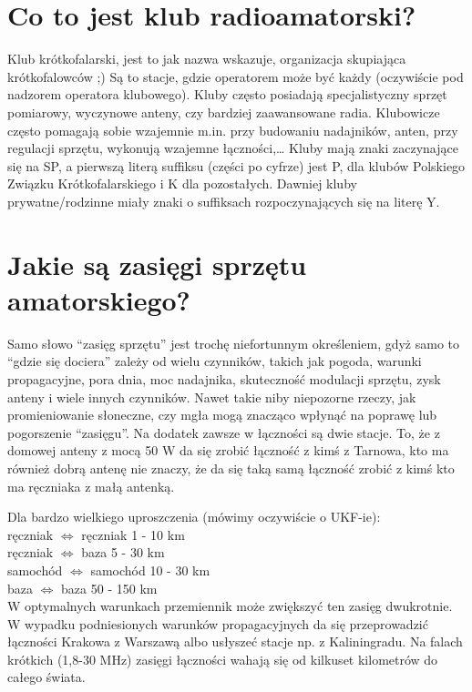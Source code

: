 \documentclass[a4paper,12pt]{article}
\begin{document}
\section{Co to jest klub radioamatorski?}
Klub krótkofalarski, jest to jak nazwa wskazuje, organizacja skupiająca krótkofalowców ;) Są to stacje, gdzie operatorem może być każdy (oczywiście pod nadzorem operatora klubowego). Kluby często posiadają specjalistyczny sprzęt pomiarowy, wyczynowe anteny, czy bardziej zaawansowane radia. Klubowicze często pomagają sobie wzajemnie m.in. przy budowaniu nadajników, anten, przy regulacji sprzętu, wykonują wzajemne łączności,…
Kluby mają znaki zaczynające się na SP, a pierwszą literą suffiksu (części po cyfrze) jest P, dla klubów Polskiego Związku Krótkofalarskiego i K dla pozostałych. Dawniej kluby prywatne/rodzinne miały znaki o suffiksach rozpoczynających się na literę Y. 

\section{Jakie są zasięgi sprzętu amatorskiego?}
Samo słowo “zasięg sprzętu” jest trochę niefortunnym określeniem, gdyż samo to “gdzie się dociera” zależy od wielu czynników, takich jak pogoda, warunki propagacyjne, pora dnia, moc nadajnika, skuteczność modulacji sprzętu, zysk anteny i wiele innych czynników. Nawet takie niby niepozorne rzeczy, jak promieniowanie słoneczne, czy mgła mogą znacząco wpłynąć na poprawę lub pogorszenie “zasięgu”.
Na dodatek zawsze w łączności są dwie stacje. To, że z domowej anteny z mocą 50 W da się zrobić łączność z kimś z Tarnowa, kto ma również dobrą antenę nie znaczy, że da się taką samą łączność zrobić z kimś kto ma ręczniaka z małą antenką. 

Dla bardzo wielkiego uproszczenia (mówimy oczywiście o UKF-ie):\\
ręczniak $\Leftrightarrow$ ręczniak 1 - 10 km\\
ręczniak $\Leftrightarrow$ baza 5 - 30 km\\
samochód $\Leftrightarrow$ samochód 10 - 30 km\\
baza $\Leftrightarrow$ baza 50 - 150 km \\

W optymalnych warunkach przemiennik może zwiększyć ten zasięg dwukrotnie.
W wypadku podniesionych warunków propagacyjnych da się przeprowadzić łączności Krakowa z Warszawą albo usłyszeć stacje np. z Kaliningradu.
Na falach krótkich (1,8-30 MHz) zasięgi łączności wahają się od kilkuset kilometrów do całego świata. 
\end{document}
